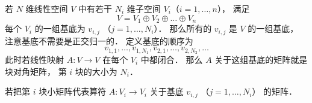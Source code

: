 
\begin{issues}
\issueDraft
\end{issues}


若 $N$ 维线性空间 $V$ 中有若干 $N_i$ 维子空间 $V_i$（$i=1,\dots,n$）， 满足
\begin{equation}
V = V_1 \oplus V_2 \oplus \dots \oplus V_n
\end{equation}
每个 $V_i$ 的一组基底为 $v_{i,j}$ （$j=1,\dots,N_i$）． 那么所有的 $v_{i,j}$ 是 $V$ 的一组基底， 注意基底不需要是正交归一的． 定义基底的顺序为
\begin{equation}
v_{1,1},\dots, v_{1,N_1}, v_{2,1}, \dots, v_{2,N_2}, \dots
\end{equation}
此时若线性映射 $A: V\to V$ 在每个 $V_i$ 中都闭合． 那么 $A$ 关于这组基底的矩阵就是块对角矩阵， 第 $i$ 块的大小为 $N_i$．

若把第 $i$ 块小矩阵代表算符 $A:V_i\to V_i$ 关于基底 $v_{i,j}$ （$j=1,\dots,N_i$） 的矩阵．
